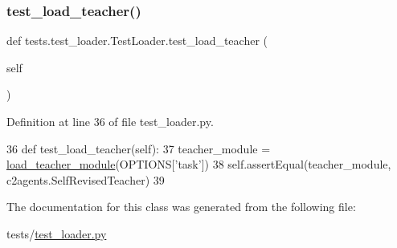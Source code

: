 \subsubsection{\texorpdfstring{test\+\_\+load\+\_\+teacher()}{test\_load\_teacher()}}
{\footnotesize\ttfamily def tests.\+test\+\_\+loader.\+Test\+Loader.\+test\+\_\+load\+\_\+teacher (\begin{DoxyParamCaption}\item[{}]{self }\end{DoxyParamCaption})}



Definition at line 36 of file test\+\_\+loader.\+py.


\begin{DoxyCode}
36     \textcolor{keyword}{def }test\_load\_teacher(self):
37         teacher\_module = \hyperlink{namespaceparlai_1_1core_1_1loader_a9eed9fa0f15170da9d4de24c2c3d4e2a}{load\_teacher\_module}(OPTIONS[\textcolor{stringliteral}{'task'}])
38         self.assertEqual(teacher\_module, c2agents.SelfRevisedTeacher)
39 
\end{DoxyCode}


The documentation for this class was generated from the following file\+:\begin{DoxyCompactItemize}
\item 
tests/\hyperlink{test__loader_8py}{test\+\_\+loader.\+py}\end{DoxyCompactItemize}
